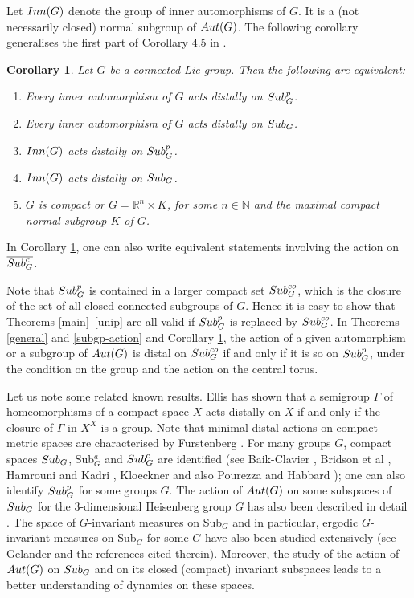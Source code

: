 \documentclass{amsart}
\numberwithin{equation}{section}
\newcommand{\Aut}{{\rm Aut}}
\newcommand{\Sub}{{\rm Sub}}
\newcommand{\N}{{\mathbb N}}
\newcommand{\R}{{\mathbb R}}
\newcommand{\spg}{{\rm Sub}^p_G}
\newcommand{\Inn}{{\rm Inn}}
\let\ol=\overline
\newtheorem{cor}[thm]{Corollary}
\theoremstyle{remark}
\begin{document}
Let $\Inn(G)$ denote the group of inner automorphisms of $G$. It is a (not necessarily closed) normal 
subgroup of $\Aut(G)$. The following corollary generalises the first part of Corollary 4.5 in \cite{SY3}. 

\begin{cor} \label{inner}
Let $G$ be a connected Lie group. Then the following are equivalent: 
\begin{enumerate}
\item Every inner automorphism of $G$ acts distally on $\spg$.
\item Every inner automorphism of $G$ acts distally on $\Sub_G$. 
\item $\Inn(G)$ acts distally on $\spg$.
\item $\Inn(G)$ acts distally on $\Sub_G$. 
\item $G$ is compact or $G=\R^n\times K$, for some $n\in\N$ and the maximal compact normal 
subgroup $K$ of $G$. 
\end{enumerate}
\end{cor}

In Corollary \ref{inner}, one can also write equivalent statements involving the action on $\ol{\Sub^c_G}$. 

Note that $\spg$ is contained in a larger compact set $\Sub^{co}_G$, which is the closure of the set of all closed connected 
subgroups of $G$. Hence it is easy to show that Theorems \ref{main}--\ref{unip} are all valid if $\spg$ is replaced by
$\Sub^{co}_G$. In Theorems \ref{general} and \ref{subgp-action} and Corollary \ref{inner}, the action of a given 
automorphism or a subgroup of $\Aut(G)$ is distal on $\Sub^{co}_G$ if and only if it is so on $\spg$, under the condition 
on the group and the action on the central torus. 

Let us note some related known results. Ellis \cite{E} has shown that a semigroup $\Gamma$ of homeomorphisms of 
a compact space $X$ acts distally on $X$ 
if and only if the closure of $\Gamma$ in $X^X$ is a group. Note that minimal distal actions on compact metric 
spaces are characterised by Furstenberg \cite{Fu}. For many groups $G$, compact spaces $\Sub_G$, 
Sub$^a_G$ and $\Sub^c_G$ are identified (see Baik-Clavier \cite{BC1, BC2}, Bridson et al \cite{BHK}, Hamrouni and Kadri 
\cite{HamKa}, Kloeckner \cite{Kl} and also Pourezza and Habbard \cite{PH}); 
one can also identify $\spg$ for some groups $G$. The action of $\Aut(G)$ on some subspaces of $\Sub_G$ for the 3-dimensional 
Heisenberg group $G$ has also been described in detail \cite{BHK}. The space of $G$-invariant measures 
on Sub$_G$ and in particular, ergodic $G$-invariant measures on Sub$_G$ for some $G$ have also been studied extensively (see 
Gelander \cite{G} and the references cited therein). Moreover, the study of the action of $\Aut(G)$ on $\Sub_G$ and on 
its closed (compact) invariant subspaces leads to a better understanding of dynamics on these spaces. 
\end{document}
